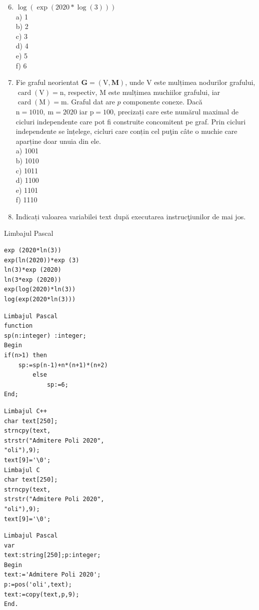 \documentclass[10pt]{article}
\begin{document}
\begin{enumerate}
  \setcounter{enumi}{5}
  \item $\log (\exp (2020 * \log (3)))$\\
a) 1\\
b) 2\\
c) 3\\
d) 4\\
e) 5\\
f) 6
  \item Fie graful neorientat $\mathbf{G}=(\mathrm{V}, \mathbf{M})$, unde V este mulțimea nodurilor grafului, $\operatorname{card}(\mathrm{V})=\mathrm{n}$, respectiv, M este mulțimea muchiilor grafului, iar $\operatorname{card}(\mathrm{M})=\mathrm{m}$. Graful dat are $p$ componente conexe. Dacă $\mathrm{n}=1010, \mathrm{~m}=2020$ iar $\mathrm{p}=100$, precizați care este numărul maximal de cicluri independente care pot fi construite concomitent pe graf. Prin cicluri independente se înțelege, cicluri care conțin cel puţin câte o muchie care aparține doar unuia din ele.\\
a) 1001\\
b) 1010\\
c) 1011\\
d) 1100\\
e) 1101\\
f) 1110
  \item Indicați valoarea variabilei text după executarea instrucţiunilor de mai jos.
\end{enumerate}

Limbajul Pascal

\begin{verbatim}
exp (2020*ln(3))
exp(ln(2020))*exp (3)
ln(3)*exp (2020)
ln(3*exp (2020))
exp(log(2020)*ln(3))
log(exp(2020*ln(3)))
\end{verbatim}

\begin{verbatim}
Limbajul Pascal
function
sp(n:integer) :integer;
Begin
if(n>1) then
    sp:=sp(n-1)+n*(n+1)*(n+2)
        else
            sp:=6;
End;
\end{verbatim}

\begin{verbatim}
Limbajul C++
char text[250];
strncpy(text,
strstr("Admitere Poli 2020",
"oli"),9);
text[9]='\0';
Limbajul C
char text[250];
strncpy(text,
strstr("Admitere Poli 2020",
"oli"),9);
text[9]='\0';
\end{verbatim}

\begin{verbatim}
Limbajul Pascal
var
text:string[250];p:integer;
Begin
text:='Admitere Poli 2020';
p:=pos('oli',text);
text:=copy(text,p,9);
End.
\end{verbatim}
\end{document}
